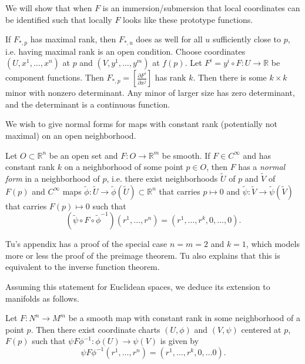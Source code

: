 We will show that when $F$ is an immersion/submersion that local
coordinates can be identified such that locally $F$ looks like these
prototype functions.

\begin{remark}
If $F_{\ast, p}$ has maximal rank, then $F_{\ast, u}$ does as well for
all $u$ sufficiently close to $p$, i.e. having maximal rank is an open
condition. Choose coordinates $(U, x^1, \dots, x^n)$ at $p$
and $(V, y^1, \dots, y^m)$ at $f(p)$. Let
$F^i = y^i \circ F : U \to \mathbb{R}$ be component functions. Then
$F_{\ast, p} = \left[\frac{\partial F^i}{\partial x^j}\right]$ has
rank $k$. Then there is some $k \times k$ minor with nonzero
determinant. Any minor of larger size has zero determinant,
 and the determinant is a continuous function.
\end{remark}

We wish to give normal forms for maps with constant rank (potentially
not maximal) on an open neighborhood.

\begin{theorem}
Let $O \subset \mathbb{R}^n$ be an open set and
$F: O \to \mathbb{R}^m$ be smooth.
If $F \in C^\infty$ and has constant rank $k$ on a neighborhood of
some point $p \in O$, then $F$ has a \emph{normal form} in a
neighborhood of $p$, i.e. there exist neighborhoods
$\tilde{U}$ of $p$ and $\tilde{V}$ of $F(p)$ and
$C^\infty$ maps
$\tilde{\phi}: \tilde{U} \to \tilde{\phi}(\tilde{U}) \subset \mathbb{R}^n$
that carries $p \mapsto 0$ and
$\tilde{\psi} : \tilde{V} \to \tilde{\psi}(\tilde{V})$ that carries
$F(p) \mapsto 0$ such that
$$
  (\tilde{\psi} \circ F \circ \tilde{\phi}^{-1})
    (r^1, \dots, r^n)
= (r^1, \dots, r^k, 0, \dots, 0).
$$
\end{theorem}

\begin{remark}
Tu's appendix has a proof of the special case $n = m = 2$ and $k = 1$,
which models more or less the proof of the preimage theorem. Tu also
explains that this is equivalent to the inverse function theorem.
\end{remark}

Assuming this statement for Euclidean spaces, we deduce its extension
to manifolds as follows.

\begin{theorem}
Let $F: N^n \to M^m$ be a smooth map with constant rank in some
neighborhood of a point $p$. Then there exist coordinate charts
$(U, \phi)$ and $(V, \psi)$ centered at $p$, $F(p)$ such that
$\psi F \phi^{-1}: \phi(U) \to \psi(V)$ is given by
$$
  \psi F \phi^{-1}
    (r^1, \dots, r^n)
= (r^1, \dots, r^k, 0, \dots 0).
$$
\end{theorem}

